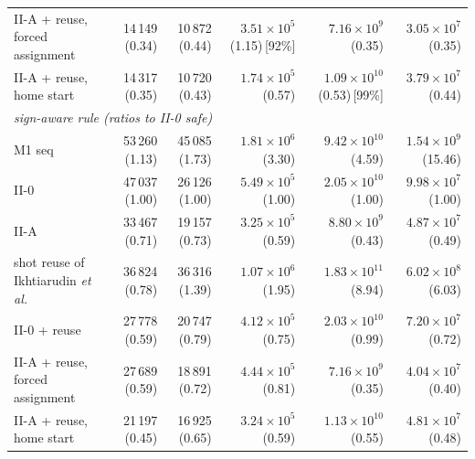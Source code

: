 \documentclass[aps,pra,reprint,superscriptaddress,nofootinbib]{revtex4-2}
\begin{document}
\begin{table}[!htb]
\begin{tabular}{lrrrrr}
II-A + reuse, forced assignment & 14\,149 (0.34) & 10\,872 (0.44) & $3.51\times10^{5}$ (1.15){\,\scriptsize[92\%]} & $7.16\times10^{9}$ (0.35) & $3.05\times10^{7}$ (0.35) \\
II-A + reuse, home start & 14\,317 (0.35) & 10\,720 (0.43) & $1.74\times10^{5}$ (0.57) & $1.09\times10^{10}$ (0.53){\,\scriptsize[99\%]} & $3.79\times10^{7}$ (0.44) \\
\multicolumn{6}{l}{\emph{sign-aware rule (ratios to II-0 safe)}} \\
M1 seq & 53\,260 (1.13) & 45\,085 (1.73) & $1.81\times10^{6}$ (3.30) & $9.42\times10^{10}$ (4.59) & $1.54\times10^{9}$ (15.46) \\
II-0 & 47\,037 (1.00) & 26\,126 (1.00) & $5.49\times10^{5}$ (1.00) & $2.05\times10^{10}$ (1.00) & $9.98\times10^{7}$ (1.00) \\
II-A & 33\,467 (0.71) & 19\,157 (0.73) & $3.25\times10^{5}$ (0.59) & $8.80\times10^{9}$ (0.43) & $4.87\times10^{7}$ (0.49) \\
shot reuse of Ikhtiarudin \textit{et al.} & 36\,824 (0.78) & 36\,316 (1.39) & $1.07\times10^{6}$ (1.95) & $1.83\times10^{11}$ (8.94) & $6.02\times10^{8}$ (6.03) \\
II-0 + reuse & 27\,778 (0.59) & 20\,747 (0.79) & $4.12\times10^{5}$ (0.75) & $2.03\times10^{10}$ (0.99) & $7.20\times10^{7}$ (0.72) \\
II-A + reuse, forced assignment & 27\,689 (0.59) & 18\,891 (0.72) & $4.44\times10^{5}$ (0.81) & $7.16\times10^{9}$ (0.35) & $4.04\times10^{7}$ (0.40) \\
II-A + reuse, home start & 21\,197 (0.45) & 16\,925 (0.65) & $3.24\times10^{5}$ (0.59) & $1.13\times10^{10}$ (0.55) & $4.81\times10^{7}$ (0.48) \\
\bottomrule
\end{tabular}
\end{table}
\end{document}
